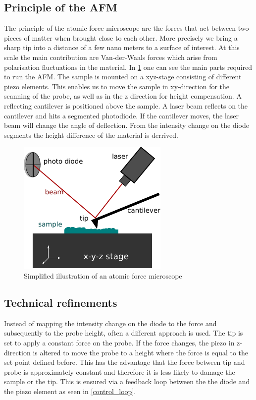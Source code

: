 \documentclass[paper=a4,fontsize=10pt,DIV=18,twocolumn,parskip=half]{scrartcl}
\numberwithin{equation}{section}    %
\begin{document}
\subsection{Principle of the AFM}
The principle of the atomic force microscope are the forces that act between two 
pieces of matter when brought close to each other. More precisely we bring a 
sharp tip into a distance of a few nano meters to a surface of interest. At this 
scale the main contribution are Van-der-Waals forces which arise from 
polarisation fluctuations in the material. In \cref{afm_scheme} one can see the 
main parts required to run the AFM.  The sample is mounted on a xyz-stage 
consisting of different piezo elements.  This enables us to move the sample in 
xy-direction for the scanning of the probe, as well as in the z direction for 
height compensation. A reflecting cantilever is positioned above the sample. A 
laser beam reflects on the cantilever and hits a segmented photodiode. If the 
cantilever moves, the laser beam will change the angle of deflection.  From the 
intensity change on the diode segments the height difference of the material is 
derrived.

\begin{figure}
    \centering
    \includegraphics{Bilder/afm_scheme.pdf}
    \caption{Simplified illustration of an atomic force microscope}
    \label{afm_scheme}
\end{figure}

\subsection{Technical refinements}
Instead of mapping the intensity change on the diode to the force and 
subsequently to the probe height, often a different approach is used. The tip is 
set to apply a constant force on the probe. If the force changes, the piezo in 
z-direction is altered to move the probe to a height where the force is equal to 
the set point defined before. This has the advantage that the force between tip 
and probe is approximately constant and therefore it is less likely to damage 
the sample or the tip. This is ensured via a feedback loop between the the diode 
and the piezo element as seen in \cref{control_loop}.
\end{document}
